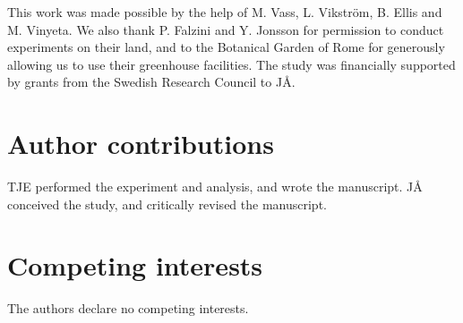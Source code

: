 \documentclass[twocolumn,twoside,lettersize]{article}
\begin{document}
This work was made possible by the help of M. Vass, L. Vikström, B. Ellis and M. Vinyeta. We also thank P. Falzini and Y. Jonsson for permission to conduct experiments on their land, and to the Botanical Garden of Rome for generously allowing us to use their greenhouse facilities. The study was financially supported by grants from the Swedish Research Council to JÅ.

\section*{Author contributions}

TJE performed the experiment and analysis, and wrote the manuscript. JÅ conceived the study, and critically revised the manuscript.

\section*{Competing interests}

The authors declare no competing interests.


\end{document}
